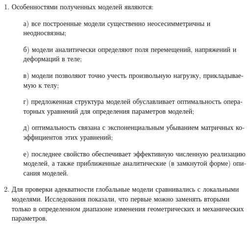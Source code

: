 \begin{russian}
\begin{enumerate}
\item Особенностями полученных моделей являются:
\begin{itemize}
\item[а)] 	все построенные модели существенно неосесимметричны и неодносвязны;
\item[б)] модели аналитически определяют поля перемещений, напряжений и деформаций в теле;
\item[в)] модели позволяют точно учесть произвольную нагрузку, прикладываемую к телу;
\item[г)] предложенная структура моделей обуславливает оптимальность операторных уравнений для определения параметров моделей;
\item[д)] оптимальность связана с экспоненциальным убыванием матричных коэффициентов этих уравнений;
\item[е)] последнее свойство обеспечивает эффективную численную реализацию моделей, а также приближенные аналитические (в замкнутой форме) описания моделей.
\end{itemize}
\item Для проверки адекватности глобальные модели сравнивались с локальными моделями. Исследования показали, что первые можно заменять вторыми только в определенном диапазоне изменения геометрических и механических параметров.
\end{enumerate}
\end{russian}